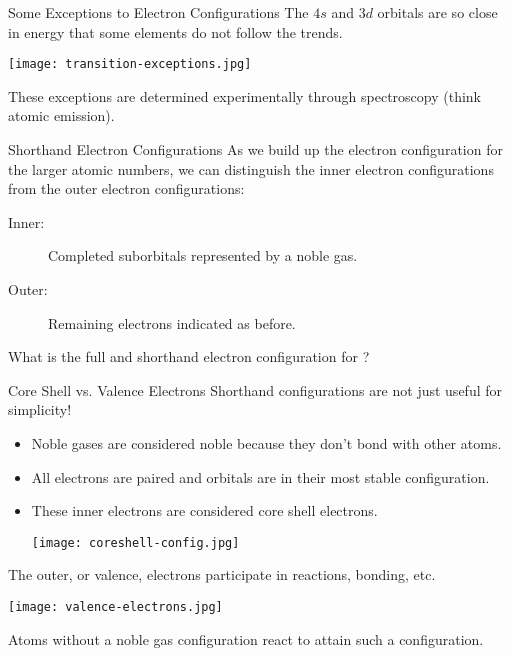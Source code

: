 \documentclass[notes=only]{beamer}
\begin{document}
\begin{frame}{Some Exceptions to Electron Configurations}
	The $4s$ and $3d$ orbitals are so close in energy that
	some elements do not follow the trends.
	\begin{center}
		\texttt{[image: transition-exceptions.jpg]}
	\end{center}
	These exceptions are determined experimentally through
	spectroscopy (think atomic emission).
\end{frame}

\begin{frame}[t]{Shorthand Electron Configurations}
	As we build up the electron configuration for the larger atomic numbers,
	we can distinguish the \alert{inner} electron configurations from the
	\alert{outer} electron configurations:

	\begin{description}
		\item[Inner:] Completed suborbitals represented by a
			noble gas.
		\item[Outer:] Remaining electrons indicated as before.
	\end{description}

	\bigskip

	\begin{example}
		What is the full and shorthand electron configuration for
		?
	\end{example}
\end{frame}

\begin{frame}[allowframebreaks]{Core Shell vs. Valence Electrons}
	Shorthand configurations are not just useful for simplicity!
	\begin{itemize}
		\item Noble gases are considered noble because they don't bond
			with other atoms.
		\item All electrons are paired and orbitals are in their most
			stable configuration.
		\item These inner electrons are considered \alert{core shell}
			electrons.
			\smallskip
			\begin{center}
		\texttt{[image: coreshell-config.jpg]}
	\end{center}
	\end{itemize}

	\framebreak%

	The outer, or \alert{valence}, electrons participate in
	reactions, bonding, etc.
	\begin{center}
		\texttt{[image: valence-electrons.jpg]}
	\end{center}
	Atoms without a \alert{noble gas configuration} react to attain such a
	configuration.
\end{frame}
\end{document}
